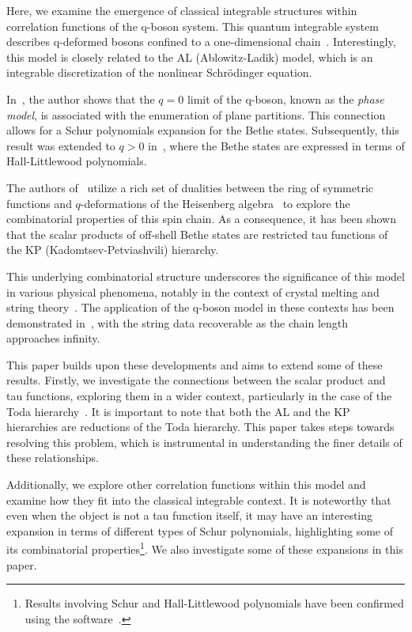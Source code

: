 \documentclass[a4paper,11pt]{amsart}
\begin{document}
Here, we examine the emergence of classical integrable structures
within correlation functions of the q-boson system. This quantum
integrable system describes q-deformed bosons confined to a
one-dimensional chain~\cite{Bogoliubov:1992, Bogoliubov:1997soj,
  Bogoliubov2005}.  Interestingly, this model is closely related to
the AL (Ablowitz-Ladik) model, which is an integrable discretization
of the nonlinear Schrödinger equation.

In~\cite{Bogoliubov2005}, the author shows that the \(q = 0\)
limit of the q-boson, known as the \emph{phase model}, is associated
with the enumeration of plane partitions. This connection allows for a
Schur polynomials expansion for the Bethe states. Subsequently, this
result was extended to \(q > 0\) in~\cite{Tsilevich:2006}, where the
Bethe states are expressed in terms of Hall-Littlewood polynomials.

The authors of~\cite{Foda:2008hn, Wheeler:2010vmq} utilize a rich
set of dualities between the ring of symmetric functions and
\(q\)-deformations of the Heisenberg algebra~\cite{Jing1991, Jing1995}
to explore the combinatorial properties of this spin chain. As a
consequence, it has been shown that the scalar products of off-shell
Bethe states are restricted tau functions of the KP
(Kadomtsev-Petviashvili) hierarchy.

This underlying combinatorial structure underscores the significance
of this model in various physical phenomena, notably in the context of
crystal melting and string theory~\cite{Okounkov:2003sp,
  Saulina:2004da}.  The application of the q-boson model in these
contexts has been demonstrated in~\cite{Sulkowski:2008mx}, with the
string data recoverable as the chain length approaches infinity.

This paper builds upon these developments and aims to extend some of
these results. Firstly, we investigate the connections between the
scalar product and tau functions, exploring them in a wider context,
particularly in the case of the Toda
hierarchy~\cite{Takasaki:2018wsv}. It is important to note that both
the AL and the KP hierarchies are reductions of the Toda
hierarchy. This paper takes steps towards resolving this problem,
which is instrumental in understanding the finer details of these
relationships.

Additionally, we explore other correlation functions within this model
and examine how they fit into the classical integrable context. It is
noteworthy that even when the object is not a tau function itself, it
may have an interesting expansion in terms of different types of
Schur polynomials, highlighting some of its combinatorial
properties\footnote{Results involving Schur and Hall-Littlewood
polynomials have been confirmed using the
software~\cite{Araujo:2024piv}.}. We also investigate some of these
expansions in this paper.
\end{document}
